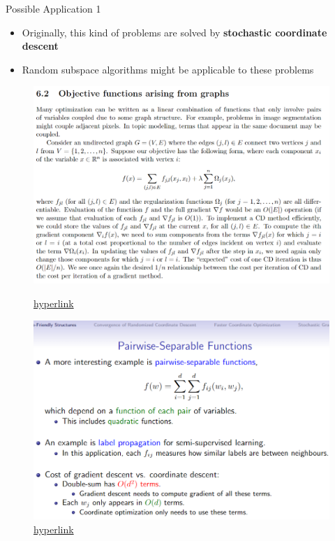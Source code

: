 \documentclass[13pt,aspectratio=169,table,dvipdfmx]{beamer}
\newif\ifShowHidden
\begin{document}
\ifShowHidden
    \begin{frame}{Possible Application 1}
        \begin{itemize}
            \item Originally, this kind of problems are solved by \textbf{stochastic coordinate descent}
            \item Random subspace algorithms might be applicable to these problems
        \end{itemize}
        \begin{figure}[htbp]
            \begin{minipage}{0.45\hsize}
                \centering
                \includegraphics[width=\columnwidth]{imgs/SCD1.png}
                \caption{\href{https://people.eecs.berkeley.edu/~brecht/opt4ml_book/O4MD_06_Coordinate_Descent.pdf}{hyperlink}}
            \end{minipage}
            \begin{minipage}{0.45\hsize}
                \centering
                \includegraphics[width=\columnwidth]{imgs/SCD2.png}
                \caption{\href{https://www.cs.ubc.ca/~schmidtm/Courses/5XX-S22/S3.pdf}{hyperlink}}
            \end{minipage}
        \end{figure}
    \end{frame}
\end{document}
